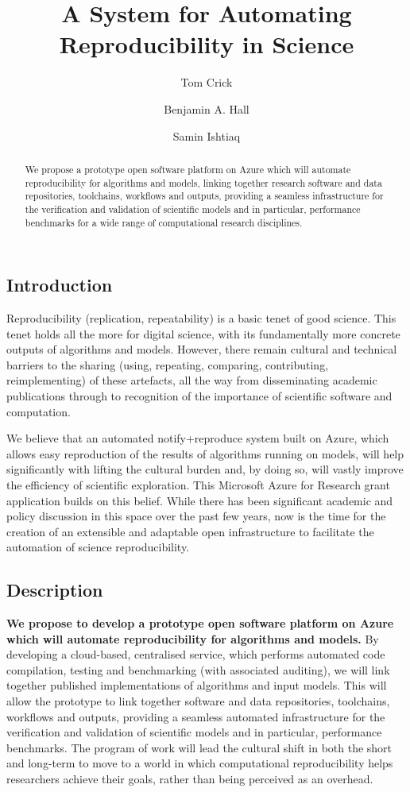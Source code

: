 \documentclass[a4paper,10pt]{article}
\title{\vspace{-4em}A System for Automating Reproducibility in Science}
\author[1]{Tom Crick}
\author[2]{Benjamin A. Hall}
\author[3]{Samin Ishtiaq}
\affil[1]{Department of Computing \& Information Systems, Cardiff Metropolitan University}
\affil[2]{MRC Cancer Unit, University of Cambridge}
\affil[3]{Microsoft Research Cambridge}
\affil[1]{\protect\url{tcrick@cardiffmet.ac.uk}}
\date{ }
\begin{document}
\maketitle

\begin{abstract}
We propose a prototype open software platform on Azure which will
automate reproducibility for algorithms and models, linking together
research software and data repositories, toolchains, workflows and
outputs, providing a seamless infrastructure for the verification and
validation of scientific models and in particular, performance
benchmarks for a wide range of computational research disciplines.
\end{abstract}


\subsection*{Introduction}

Reproducibility (replication, repeatability) is a basic tenet of good
science. This tenet holds all the more for digital science, with its
fundamentally more concrete outputs of algorithms and models. However,
there remain cultural and technical barriers to the sharing (using,
repeating, comparing, contributing, reimplementing) of these
artefacts, all the way from disseminating academic publications
through to recognition of the importance of scientific software and
computation.

We believe that an automated notify+reproduce system built on Azure,
which allows easy reproduction of the results of algorithms running on
models, will help significantly with lifting the cultural burden and,
by doing so, will vastly improve the efficiency of scientific
exploration. This Microsoft Azure for Research grant application
builds on this belief. While there has been significant academic and
policy discussion in this space over the past few years, now is the
time for the creation of an extensible and adaptable open
infrastructure to facilitate the automation of science
reproducibility.


\subsection*{Description}
{\textbf{We propose to develop a prototype open software platform on
Azure which will automate reproducibility for algorithms and models.}}
By developing a cloud-based, centralised service, which performs
automated code compilation, testing and benchmarking (with associated
auditing), we will link together published implementations of
algorithms and input models. This will allow the prototype to link
together software and data repositories, toolchains, workflows and
outputs, providing a seamless automated infrastructure for the
verification and validation of scientific models and in particular,
performance benchmarks. The program of work will lead the cultural
shift in both the short and long-term to move to a world in which
computational reproducibility helps researchers achieve their goals,
rather than being perceived as an overhead.
\end{document}
